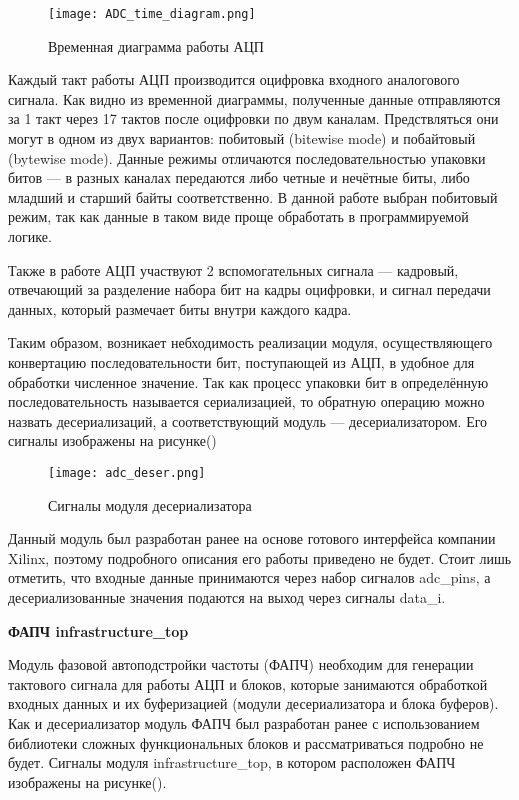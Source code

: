 \begin{figure}[ht]
    \centering
    \texttt{[image: ADC\_time\_diagram.png]}
    \caption{Временная диаграмма работы АЦП}
    \label{fig:mpr}
\end{figure}
Каждый такт работы АЦП производится оцифровка входного аналогового сигнала. Как видно из временной диаграммы, полученные данные отправляются за 1 такт через 17 тактов после оцифровки по двум каналам. Предствляться они могут в одном из двух вариантов: побитовый (bitewise mode) и побайтовый (bytewise mode). Данные режимы отличаются последовательностью упаковки битов --- в разных каналах передаются либо четные и нечётные биты, либо младший и старший байты соответственно. В данной работе выбран побитовый режим, так как данные в таком виде проще обработать в программируемой логике.\par
Также в работе АЦП участвуют 2 вспомогательных сигнала --- кадровый, отвечающий за разделение набора бит на кадры оцифровки, и сигнал передачи данных, который размечает биты внутри каждого кадра.\par
Таким образом, возникает небходимость реализации модуля, осуществляющего конвертацию последовательности бит, поступающей из АЦП, в удобное для обработки численное значение. Так как процесс упаковки бит в определённую последовательность называется сериализацией, то обратную операцию можно назвать десериализаций, а соответствующий модуль --- десериализатором. Его сигналы изображены на рисунке()\par
\begin{figure}[ht]
    \centering
    \texttt{[image: adc\_deser.png]}
    \caption{Сигналы модуля десериализатора}
    \label{fig:mpr}
\end{figure}
Данный модуль был разработан ранее на основе готового интерфейса компании Xilinx, поэтому подробного описания его работы приведено не будет. Стоит лишь отметить, что входные данные принимаются через набор сигналов adc\_pins, а десериализованные значения подаются на выход через сигналы data\_i.\par
\textbf{ФАПЧ infrastructure\_top}\par
Модуль фазовой автоподстройки частоты (ФАПЧ) необходим для генерации тактового сигнала для работы АЦП и блоков, которые занимаются обработкой входных данных и их буферизацией (модули десериализатора и блока буферов). Как и десериализатор модуль ФАПЧ был разработан ранее с использованием библиотеки сложных функциональных блоков и рассматриваться подробно не будет. Сигналы модуля infrastructure\_top, в котором расположен ФАПЧ изображены на рисунке().\par
